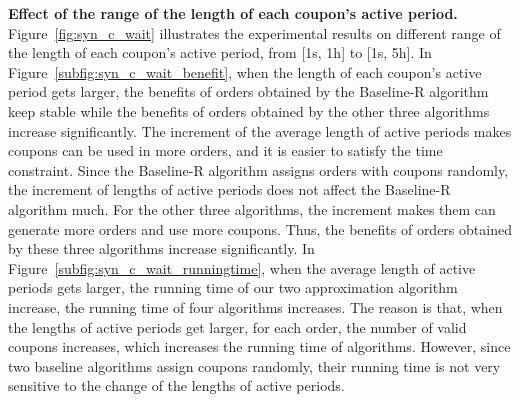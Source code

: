 \textbf{Effect of the range of the length of each coupon's active period.} Figure~\ref{fig:syn_c_wait} illustrates the experimental results on different range of the length of each coupon's active period, from [1s, 1h] to [1s, 5h]. In Figure~\ref{subfig:syn_c_wait_benefit}, when the length of each coupon's active period gets larger, the benefits of orders obtained by the Baseline-R algorithm keep stable while the benefits of orders obtained by the other three algorithms increase significantly. The increment of the average length of active periods makes coupons can be used in more orders, and it is easier to satisfy the time constraint. Since the Baseline-R algorithm assigns orders with coupons randomly, the increment of lengths of active periods does not affect the Baseline-R algorithm much. For the other three algorithms, the increment makes them can generate more orders and use more coupons. Thus, the benefits of orders obtained by these three algorithms increase significantly. In Figure~\ref{subfig:syn_c_wait_runningtime}, when the average length of active periods gets larger, the running time of our two approximation algorithm increase, the running time of four algorithms increases. The reason is that, when the lengths of active periods get larger, for each order, the number of valid coupons increases, which increases the running time of algorithms. However, since two baseline algorithms assign coupons randomly, their running time is not very sensitive to the change of the lengths of active periods.

\fi


